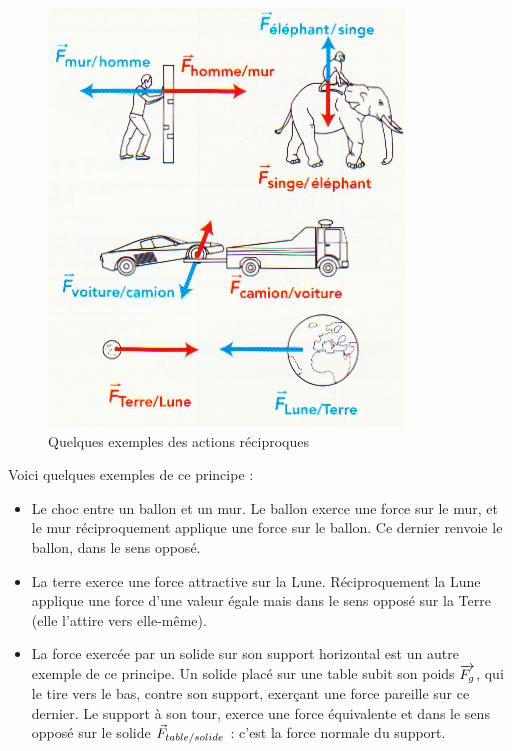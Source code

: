 \documentclass[11pt,a4paper]{article}
\begin{document}
\begingroup
\begin{figure}
  \centering
  \includegraphics[width=0.95\linewidth]{imgs/p2/acreac.jpg}
  \caption{Quelques exemples des actions réciproques}
\end{figure}

Voici quelques exemples de ce principe :
\begin{itemize}
    \item Le choc entre un ballon et un mur.  Le ballon exerce une force sur le mur, et le mur réciproquement applique une force sur le ballon. Ce dernier renvoie le ballon, dans le sens opposé.
    \item La terre exerce une force attractive sur la Lune. Réciproquement la Lune applique une force d’une valeur égale mais dans le sens opposé sur la Terre (elle l’attire vers elle-même).
    \item La force exercée par un solide sur son support horizontal est un autre exemple de ce principe.  Un solide placé sur une table subit son poids $\overrightarrow{F_{g}}$, qui le tire vers le bas, contre son support, exerçant une force pareille sur ce dernier. Le support à son tour, exerce une force équivalente et dans le sens opposé sur le solide $\vec{F}_{table/solide}$ : c'est la force normale du support.
\end{itemize}
\vfill
\end{document}
